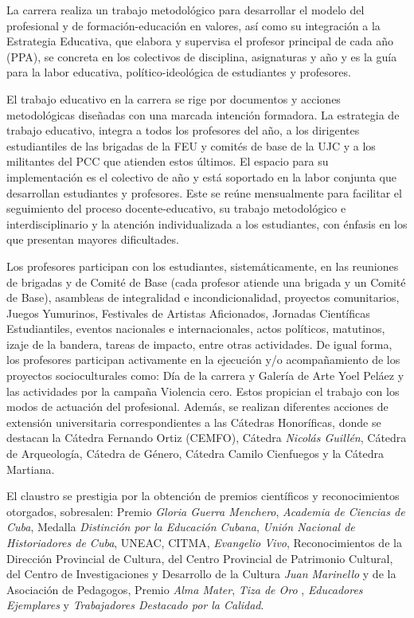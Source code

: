 La carrera realiza un trabajo metodológico para desarrollar el modelo del profesional y de formación-educación en valores, así como su integración a la Estrategia Educativa, que elabora y supervisa el profesor principal de cada año (PPA), se concreta en los colectivos de disciplina, asignaturas y año y es la guía para la labor educativa, político-ideológica de estudiantes y profesores. 

El trabajo educativo en la carrera se rige por documentos y acciones metodológicas diseñadas con una marcada intención formadora. La estrategia de trabajo educativo, integra a todos los profesores del año, a los dirigentes estudiantiles de las brigadas de la FEU y comités de base de la UJC y a los militantes del PCC que atienden estos últimos. El espacio para su implementación es el colectivo de año y está soportado en la labor conjunta que desarrollan estudiantes y profesores. Este se reúne mensualmente para facilitar el seguimiento del proceso docente-educativo, su trabajo metodológico e interdisciplinario y la atención individualizada a los estudiantes, con énfasis en los que presentan mayores dificultades. 

Los profesores participan con los estudiantes, sistemáticamente, en las reuniones de brigadas y de Comité de Base (cada profesor atiende una brigada y un Comité de Base), asambleas de integralidad e incondicionalidad, proyectos comunitarios, Juegos Yumurinos, Festivales de Artistas Aficionados, Jornadas Científicas Estudiantiles, eventos nacionales e internacionales, actos políticos, matutinos, izaje de la bandera, tareas de impacto, entre otras actividades. De igual forma, los profesores participan activamente en la ejecución y/o acompañamiento de los proyectos socioculturales como: Día de la carrera y Galería de Arte Yoel Peláez y las actividades por la campaña Violencia cero.  Estos propician el trabajo con los modos de actuación del profesional. Además, se realizan diferentes acciones de extensión universitaria correspondientes a las Cátedras Honoríficas, donde se destacan la Cátedra Fernando Ortiz (CEMFO), Cátedra \emph{Nicolás Guillén}, Cátedra de Arqueología, Cátedra de Género, Cátedra Camilo Cienfuegos y la Cátedra Martiana.

El claustro se prestigia por la obtención de premios científicos y reconocimientos otorgados, sobresalen: Premio \emph{Gloria Guerra Menchero}, \emph{Academia de Ciencias de Cuba}, Medalla \emph{Distinción por la Educación Cubana}, \emph{Unión Nacional de Historiadores de Cuba}, UNEAC, CITMA, \emph{Evangelio Vivo}, Reconocimientos de la Dirección Provincial de Cultura, del Centro Provincial de Patrimonio Cultural, del  Centro de Investigaciones y Desarrollo de la Cultura \emph{Juan Marinello} y de la Asociación de Pedagogos, Premio \emph{Alma Mater}, \emph{Tiza de Oro} , \emph{Educadores Ejemplares} y \emph{Trabajadores Destacado por la Calidad}.

